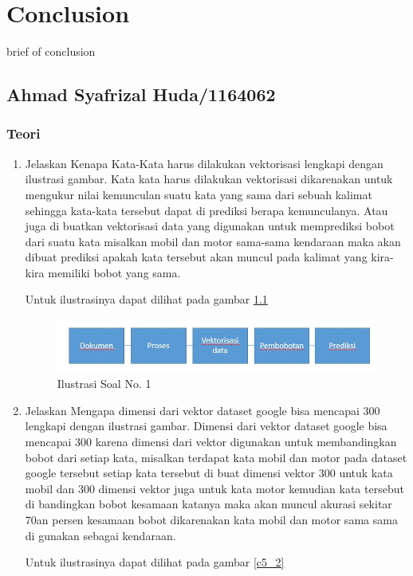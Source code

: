 \chapter{Conclusion}
brief of conclusion

\section{Ahmad Syafrizal Huda/1164062}
\subsection{Teori}
\begin{enumerate}
\item Jelaskan Kenapa Kata-Kata harus dilakukan vektorisasi lengkapi dengan ilustrasi gambar.
\subitem Kata kata harus dilakukan vektorisasi dikarenakan untuk mengukur nilai kemunculan suatu kata yang sama dari sebuah kalimat sehingga kata-kata tersebut dapat di prediksi berapa kemunculanya. Atau juga di buatkan vektorisasi data yang digunakan untuk memprediksi bobot dari suatu kata misalkan mobil dan motor sama-sama kendaraan maka akan dibuat prediksi apakah kata tersebut akan muncul pada kalimat yang kira-kira memiliki bobot yang sama. 
\par Untuk ilustrasinya dapat dilihat pada gambar \ref{c5_1}
\begin{figure}[ht]
	\centerline{\includegraphics[width=1\textwidth]{figures/huda/chapter5/1.JPG}}
	\caption{Ilustrasi Soal No. 1}
	\label{c5_1}
\end{figure}
\item Jelaskan Mengapa dimensi dari vektor dataset google bisa mencapai 300 lengkapi dengan ilustrasi gambar.
\subitem Dimensi dari vektor dataset google bisa mencapai 300 karena dimensi dari vektor digunakan untuk membandingkan bobot dari setiap kata, misalkan terdapat kata mobil dan motor pada dataset google tersebut setiap kata tersebut di buat dimensi vektor 300 untuk kata mobil dan 300 dimensi vektor juga untuk kata motor kemudian kata tersebut di bandingkan bobot kesamaan katanya maka akan muncul akurasi sekitar 70an persen kesamaan bobot dikarenakan kata mobil dan motor sama sama di gunakan sebagai kendaraan.
\par Untuk ilustrasinya dapat dilihat pada gambar \ref{c5_2}

\end{enumerate}
